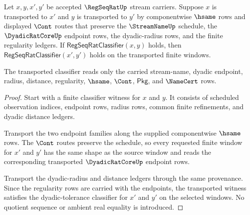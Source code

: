 \begin{theorem}
\label{thm:regseqrat-classifier-transport}
Let $x,y,x',y'$ be accepted $\RegSeqRatUp$ stream carriers. Suppose $x$ is transported to $x'$ and $y$ is transported to $y'$ by componentwise $\hsame$ rows and displayed $\Cont$ routes that preserve the $\StreamNameUp$ schedule, the $\DyadicRatCoreUp$ endpoint rows, the dyadic-radius rows, and the finite regularity ledgers. If $\mathsf{RegSeqRatClassifier}(x,y)$ holds, then $\mathsf{RegSeqRatClassifier}(x',y')$ holds on the transported finite windows.

The transported classifier reads only the carried stream-name, dyadic endpoint, radius, distance, regularity, $\hsame$, $\Cont$, $\mathsf{Pkg}$, and $\NameCert$ rows.
\end{theorem}
\begin{proof}
Start with a finite classifier witness for $x$ and $y$. It consists of scheduled observation indices, endpoint rows, radius rows, common finite refinements, and dyadic distance ledgers.

Transport the two endpoint families along the supplied componentwise $\hsame$ rows. The $\Cont$ routes preserve the schedule, so every requested finite window for $x'$ and $y'$ has the same shape as the source window and reads the corresponding transported $\DyadicRatCoreUp$ endpoint rows.

Transport the dyadic-radius and distance ledgers through the same provenance. Since the regularity rows are carried with the endpoints, the transported witness satisfies the dyadic-tolerance classifier for $x'$ and $y'$ on the selected windows. No quotient sequence or ambient real equality is introduced.
\end{proof}

